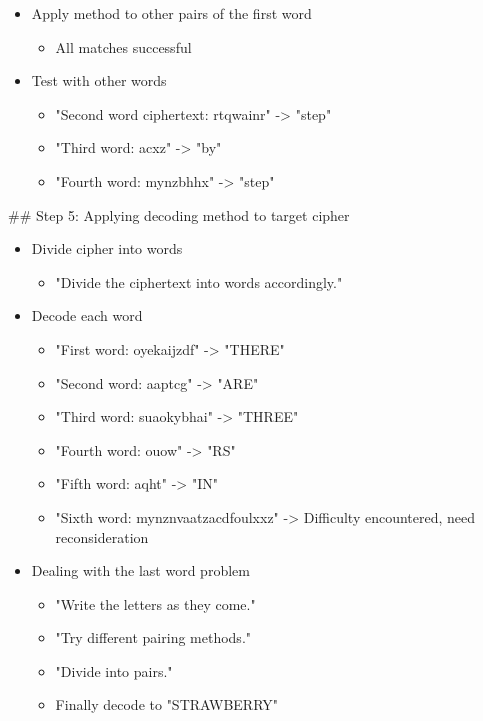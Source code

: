 \documentclass{article}
\begin{document}
\begin{tcolorbox}[colback=wkblue!10!white, colframe=wkblue!100!blue, left=2mm, right=2mm, title=\small\textcolor{black}{A document from \textsc{MathPile}-Ciphers}]
\begin{tiny}
\begin{itemize}
    \item Apply method to other pairs of the first word
    \begin{itemize}
        \item All matches successful
    \end{itemize}
    \item Test with other words
    \begin{itemize}
        \item "Second word ciphertext: rtqwainr" -> "step"
        \item "Third word: acxz" -> "by"
        \item "Fourth word: mynzbhhx" -> "step"
    \end{itemize}
\end{itemize}

\vspace{1.6mm}

\#\# Step 5: Applying decoding method to target cipher

\begin{itemize}
    \item Divide cipher into words
    \begin{itemize}
        \item "Divide the ciphertext into words accordingly."
    \end{itemize}
    \item Decode each word
    \begin{itemize}
        \item "First word: oyekaijzdf" -> "THERE"
        \item "Second word: aaptcg" -> "ARE"
        \item "Third word: suaokybhai" -> "THREE"
        \item "Fourth word: ouow" -> "RS"
        \item "Fifth word: aqht" -> "IN"
        \item "Sixth word: mynznvaatzacdfoulxxz" -> Difficulty encountered, need reconsideration
    \end{itemize}
    \item Dealing with the last word problem
    \begin{itemize}
        \item "Write the letters as they come."
        \item "Try different pairing methods."
        \item "Divide into pairs."
        \item Finally decode to "STRAWBERRY"
    \end{itemize}
\end{itemize}


\end{tiny}
\end{tcolorbox}
\end{document}
